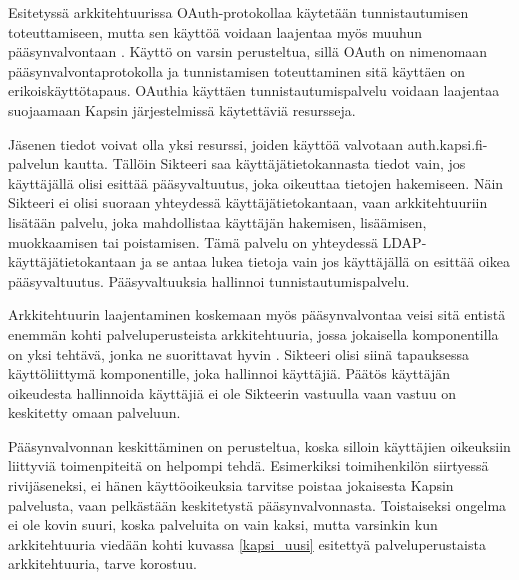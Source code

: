 Esitetyssä arkkitehtuurissa OAuth-protokollaa käytetään tunnistautumisen toteuttamiseen, mutta sen käyttöä voidaan laajentaa myös muuhun pääsynvalvontaan \cite{distributed_web_security}. Käyttö on varsin perusteltua, sillä OAuth on nimenomaan pääsynvalvontaprotokolla ja tunnistamisen toteuttaminen sitä käyttäen on erikoiskäyttötapaus. OAuthia käyttäen tunnistautumispalvelu voidaan laajentaa suojaamaan Kapsin järjestelmissä käytettäviä resursseja.

Jäsenen tiedot voivat olla yksi resurssi, joiden käyttöä valvotaan auth.kapsi.fi-pal\-ve\-lun kautta. Tällöin Sikteeri saa käyttäjätietokannasta tiedot vain, jos käyttäjällä olisi esittää pääsyvaltuutus, joka oikeuttaa tietojen hakemiseen. Näin Sikteeri ei olisi suoraan yhteydessä käyttäjätietokantaan, vaan arkkitehtuuriin lisätään palvelu, joka mahdollistaa käyttäjän hakemisen, lisäämisen, muokkaamisen tai poistamisen. Tämä palvelu on yhteydessä LDAP-käyttäjätietokantaan ja se antaa lukea tietoja vain jos käyttäjällä on esittää oikea pääsyvaltuutus. Pääsyvaltuuksia hallinnoi tunnistautumispalvelu.

Arkkitehtuurin laajentaminen koskemaan myös pääsynvalvontaa veisi sitä entistä enemmän kohti palveluperusteista arkkitehtuuria, jossa jokaisella komponentilla on yksi tehtävä, jonka ne suorittavat hyvin \cite{soa}. Sikteeri olisi siinä tapauksessa käyttöliittymä komponentille, joka hallinnoi käyttäjiä. Päätös käyttäjän oikeudesta hallinnoida käyttäjiä ei ole Sikteerin vastuulla vaan vastuu on keskitetty omaan palveluun.

Pääsynvalvonnan keskittäminen on perusteltua, koska silloin käyttäjien oikeuksiin liittyviä toimenpiteitä on helpompi tehdä. Esimerkiksi toimihenkilön siirtyessä rivijäseneksi, ei hänen käyttöoikeuksia tarvitse poistaa jokaisesta Kapsin palvelusta, vaan pelkästään keskitetystä pääsynvalvonnasta. Toistaiseksi ongelma ei ole kovin suuri, koska palveluita on vain kaksi, mutta varsinkin kun arkkitehtuuria viedään kohti kuvassa \ref{kapsi_uusi} esitettyä palveluperustaista arkkitehtuuria, tarve korostuu.